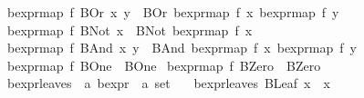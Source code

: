 \begin{isabellebody}
{}\ {}bexpr{}map\ f\ {}BOr\ x\ y{}\ {}\ BOr\ {}bexpr{}map\ f\ x{}\ {}bexpr{}map\ f\ y{}{}\isanewline
{}\ {}bexpr{}map\ f\ {}BNot\ x{}\ {}\ BNot\ {}bexpr{}map\ f\ x{}{}\isanewline
{}\ {}bexpr{}map\ f\ {}BAnd\ x\ y{}\ {}\ BAnd\ {}bexpr{}map\ f\ x{}\ {}bexpr{}map\ f\ y{}{}\isanewline
{}\ {}bexpr{}map\ f\ BOne\ {}\ BOne{}\isanewline
{}\ {}bexpr{}map\ f\ BZero\ {}\ BZero{}\isanewline
\isanewline
{}\isamarkupfalse%
\ bexpr{}leaves\ {}{}\ {}{}a\ bexpr\ {}\ {}a\ set{}\ \isanewline
\ \ {}bexpr{}leaves\ {}BLeaf\ x{}\ {}\ {}x{}{}\isanewline

\end{isabellebody}
